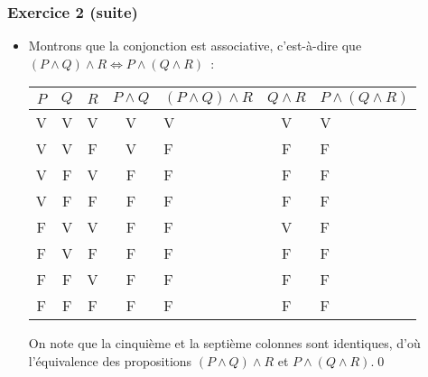 \documentclass[10pt,notheorems]{beamer}
\theoremstyle{plain}
\theoremstyle{definition} %
\begin{document}
\begin{frame}
  \frametitle{Exercice 2 (suite)}
  \fontsize{8}{10}\selectfont

  \begin{itemize}
    
  \item Montrons que la conjonction est associative, c'est-à-dire que $(P\land Q)\land R \Leftrightarrow P\land (Q\land R)$~:\newline
    \begin{table}[H]
      \centering
      \begin{tabular}[H]{|ccc|cgcg|}
        \hline
        $P$ & $Q$ & $R$ & $P\land Q$ & $(P\land Q)\land R$ & $Q\land R$ & $P \land (Q \land R)$ \\ \hline
        V & V & V & V & V & V & V\\
        V & V & F & V & F & F & F\\
        V & F & V & F & F & F & F\\
        V & F & F & F & F & F & F\\
        F & V & V & F & F & V & F\\
        F & V & F & F & F & F & F\\
        F & F & V & F & F & F & F\\
        F & F & F & F & F & F & F\\
        \hline\hline
      \end{tabular}
    \end{table}

    \bigskip
    
    On note que la cinquième et la septième colonnes sont identiques, d'où
    l'équivalence des propositions $(P\land Q)\land R$ et $P\land (Q\land R)$.\qed\newline
    
  \end{itemize}
  
\end{frame}
\end{document}
